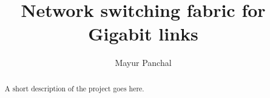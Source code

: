 \documentclass[11pt
              , a4paper
              , twoside
              , openright
              ]{report}
\title{Network switching fabric for Gigabit links}
\author{Mayur Panchal}
\date{}
\begin{document}
\frontmatter



\begin{abstract}

A short description of the project goes here.

\end{abstract}


\maketitle



\tableofcontents



\mainmatter









\backmatter



%


\end{document}
